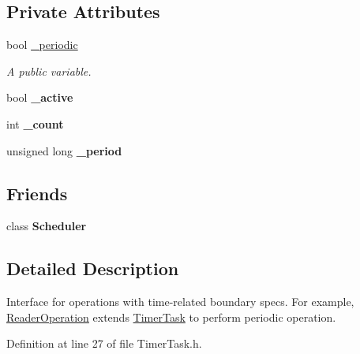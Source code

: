 \subsection*{Private Attributes}
\begin{DoxyCompactItemize}
\item 
bool \hyperlink{class_e_l_f_i_n_1_1_timer_task_afe51cab64415197cd7cf98f4c95d6028}{\-\_\-periodic}
\begin{DoxyCompactList}\small\item\em A public variable. \end{DoxyCompactList}\item 
\hypertarget{class_e_l_f_i_n_1_1_timer_task_a96e8dc60e6ea26efcbb3eed064f2f752}{bool {\bfseries \-\_\-active}}\label{class_e_l_f_i_n_1_1_timer_task_a96e8dc60e6ea26efcbb3eed064f2f752}

\item 
\hypertarget{class_e_l_f_i_n_1_1_timer_task_aefa52065d8a89d0e77ab85944be666e6}{int {\bfseries \-\_\-count}}\label{class_e_l_f_i_n_1_1_timer_task_aefa52065d8a89d0e77ab85944be666e6}

\item 
\hypertarget{class_e_l_f_i_n_1_1_timer_task_a8a7ea9b7dc6d61dd820745fcde56d695}{unsigned long {\bfseries \-\_\-period}}\label{class_e_l_f_i_n_1_1_timer_task_a8a7ea9b7dc6d61dd820745fcde56d695}

\end{DoxyCompactItemize}
\subsection*{Friends}
\begin{DoxyCompactItemize}
\item 
\hypertarget{class_e_l_f_i_n_1_1_timer_task_afb88c77ea5daaefa6c8fa6bc5b9aa5c1}{class {\bfseries Scheduler}}\label{class_e_l_f_i_n_1_1_timer_task_afb88c77ea5daaefa6c8fa6bc5b9aa5c1}

\end{DoxyCompactItemize}


\subsection{Detailed Description}
Interface for operations with time-\/related boundary specs. For example, \hyperlink{class_e_l_f_i_n_1_1_reader_operation}{Reader\-Operation} extends \hyperlink{class_e_l_f_i_n_1_1_timer_task}{Timer\-Task} to perform periodic operation. 

Definition at line 27 of file Timer\-Task.\-h.



